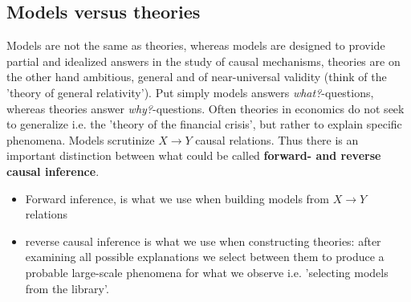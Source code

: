 \documentclass[12pt, a4paper]{article}
\begin{document}
\begin{multicols}{2}
\subsection{Models versus theories}
Models are not the same as theories, whereas models are designed to provide partial and idealized answers in the study of causal mechanisms, theories are on the other hand ambitious, general and of near-universal validity (think of the 'theory of general relativity'). Put simply models answers \textit{what?}-questions, whereas theories answer \textit{why?}-questions. Often theories in economics do not seek to generalize i.e. the 'theory of the financial crisis', but rather to explain specific phenomena. Models scrutinize $X \rightarrow Y$ causal relations. Thus there is an important distinction between what could be called \textbf{forward- and reverse causal inference}. 

\begin{itemize}
\item Forward inference, is what we use when building models from $X \rightarrow Y$ relations
\item reverse causal inference is what we use when constructing theories: after examining all possible explanations we select between them to produce a probable large-scale phenomena for what we observe i.e. 'selecting models from the library'.
\end{itemize}


\end{multicols}
\end{document}
